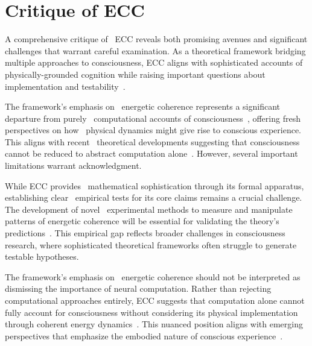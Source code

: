 \section{Critique of ECC}

A comprehensive critique of~ ECC reveals both promising avenues and significant challenges that warrant careful examination. As a theoretical framework bridging multiple approaches to consciousness, ECC aligns with sophisticated accounts of~ physically-grounded cognition while raising important questions about implementation and testability~\cite{thompson2014waking, varela2016embodied}.

The framework's emphasis on~ energetic coherence represents a significant departure from purely~ computational accounts of consciousness~\cite{koch2019feeling}, offering fresh perspectives on how~ physical dynamics might give rise to conscious experience. This aligns with recent~ theoretical developments suggesting that consciousness cannot be reduced to abstract computation alone~\cite{dennett2017bacteria, thompson2010mind}. However, several important limitations warrant acknowledgment.

While ECC provides~ mathematical sophistication through its formal apparatus, establishing clear~ empirical tests for its core claims remains a crucial challenge. The development of novel~ experimental methods to measure and manipulate patterns of energetic coherence will be essential for validating the theory's predictions~\cite{seth2021being, bosl2025dynamical}. This empirical gap reflects broader challenges in consciousness research, where sophisticated theoretical frameworks often struggle to generate testable hypotheses.

The framework's emphasis on~ energetic coherence should not be interpreted as dismissing the importance of neural computation. Rather than rejecting computational approaches entirely, ECC suggests that computation alone cannot fully account for consciousness without considering its physical implementation through coherent energy dynamics~\cite{goff2019galileo}. This nuanced position aligns with emerging perspectives that emphasize the embodied nature of conscious experience~\cite{noe2009out, gibson2015ecological}.

